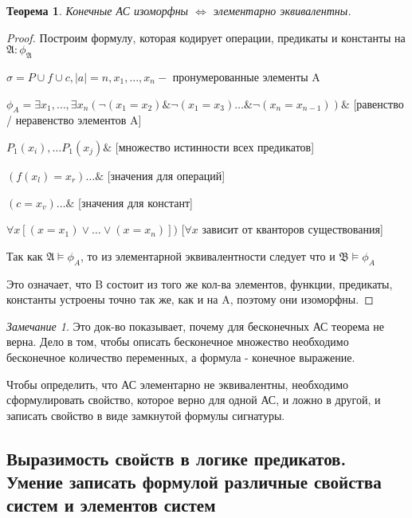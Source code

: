 \documentclass[a4paper]{article}
\newtheorem{theorem}{Теорема}[section]
\theoremstyle{definition}
\theoremstyle{remark}
\newtheorem*{remark}{Замечание}
\begin{document}
    \begin{theorem}
        Конечные АС изоморфны $\Leftrightarrow$ элементарно эквивалентны.
    \end{theorem}
    \begin{proof}
        Построим формулу, которая кодирует операции, предикаты и константы на $\mathfrak{A} : \phi_\mathfrak{A}$
        
        $\sigma = P\cup f\cup c, |a| = n, x_1, \dots, x_n - $ пронумерованные элементы A
        
        $\phi_A = \exists x_1, \dots, \exists x_n (\neg(x_1 = x_2) \& \neg (x_1 = x_3) \dots \& \neg (x_n = x_{n-1})) \&$ [равенство / неравенство элементов A]

        $P_1(x_i), \dots P_1(x_j) \&$ [множество истинности всех предикатов]

        $(f(x_l) = x_r) \dots\&$ [значения для операций]

        $(c = x_v)\dots\&$ [значения для констант]

        $\forall x[(x = x_1) \vee \dots \vee (x = x_n)])$ [$\forall x$ зависит от кванторов существования]

        Так как $\mathfrak{A}\models \phi_A$, то из элементарной эквивалентности следует что и $\mathfrak{B} \models \phi_A$

        Это означает, что B состоит из того же кол-ва элементов, функции, предикаты, константы устроены точно так же, как и на A, поэтому они изоморфны.
    \end{proof}
    \begin{remark}
        Это док-во показывает, почему для бесконечных АС теорема не верна. Дело в том, чтобы описать бесконечное множество
        необходимо бесконечное количество переменных, а формула - конечное выражение.
    \end{remark}

    Чтобы определить, что АС элементарно не эквивалентны, необходимо сформулировать свойство, которое верно для одной АС, и ложно в другой,
    и записать свойство в виде замкнутой формулы сигнатуры.
    \subsection{Выразимость свойств в логике предикатов. Умение записать формулой различные свойства систем и элементов систем}
\end{document}
